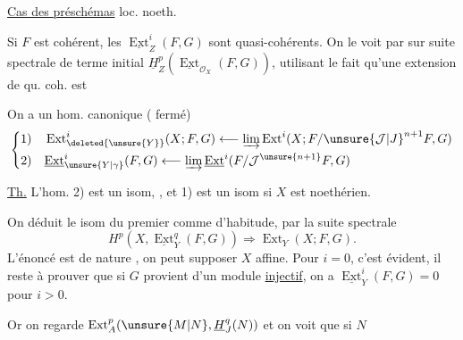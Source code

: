 \uline{Cas des préschémas} loc. noeth.

Si $F$ est cohérent, les $\underline{\operatorname{Ext}}^i_Z(F,G)$ sont quasi-cohérents. On le voit par  sur  suite spectrale de terme initial $\underline{H}^p_Z(\underline{\operatorname{Ext}}_{\mathcal O_X}(F,G))$, utilisant le fait qu'une extension de qu. coh. est  

On a un hom. canonique ( fermé)
\[
\left\{\begin{aligned}
1)\quad &\operatorname{Ext}^i_{\deleted{\unsure{Y}}}(X;F,G)\longleftarrow\varinjlim\operatorname{Ext}^i(X;F/{\unsure{\mathcal J|J}}^{n+1}F,G)\\
2)\quad &\underline{\operatorname{Ext}}^i_{\unsure{Y|\gamma}}(F,G)\longleftarrow\varinjlim\underline{\operatorname{Ext}}^i(F/\mathcal J^{\unsure{n+1}}F,G)
\end{aligned}\right.
\]

\uline{Th.}  L'hom. 2) est un isom, , et 1) est un isom si $X$ est noethérien.

On déduit  le  isom du premier comme d'habitude, par la suite spectrale
\[
H^p(X,\underline{\operatorname{Ext}}^q_Y(F,G))\Longrightarrow\operatorname{Ext}_Y(X;F,G).
\]
L'énoncé est de nature \uline{}, on peut supposer $X$ affine. Pour $i=0$, c'est évident, il reste à  prouver que si $G$ provient d'un module \uline{injectif}, on a $\underline{\operatorname{Ext}}^i_Y(F,G)=0$ pour $i>0$.

Or on regarde $\operatorname{Ext}^p_A(\unsure{M|N},\underline{H}^q_J(N))$ et on voit que si $N$
